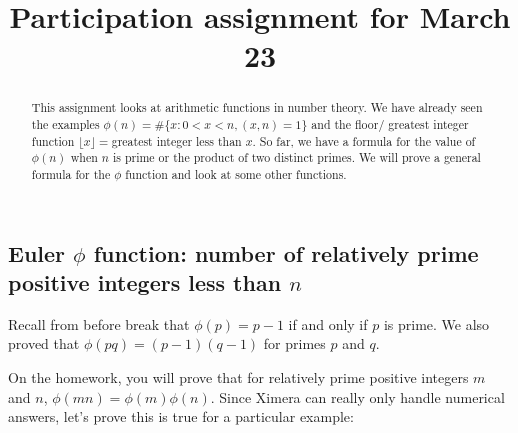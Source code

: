 \documentclass{ximera}
\title{Participation assignment for March 23}
\begin{document}
  
\begin{abstract}  
This assignment looks at arithmetic functions in number theory. We have already seen the examples $\phi(n)=\#\{x: 0<x< n, (x,n)=1\}$ and the floor/ greatest integer function $\lfloor x \rfloor=$greatest integer less than $x$. So far, we have a formula for the value of $\phi(n)$ when $n$ is prime or the product of two distinct primes. We will prove a general formula for the $\phi$ function and look at some other functions.
\end{abstract}  
\maketitle  

\subsection{Euler $\phi$ function: number of relatively prime positive integers less than $n$}
Recall from before break that $\phi(p)=p-1$ if and only if $p$ is prime. We also proved that $\phi(pq)=(p-1)(q-1)$ for primes $p$ and $q$. 

On the homework, you will prove that for relatively prime positive integers $m$ and $n$,  $\phi(mn)=\phi(m)\phi(n)$. Since Ximera can really only handle numerical answers, let's prove this is true for a particular example:
\end{document}
